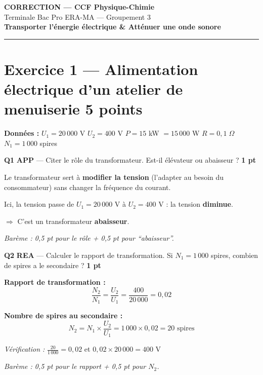 \documentclass[a4paper,11pt]{article}
\newcommand{\pts}[1]{\hfill\textcolor{gris}{\small\textbf{#1}}}
\newcommand{\comp}[1]{\colorbox{blue!10}{\scriptsize\textbf{#1}}}
\begin{document}
\begin{center}
{\LARGE\bfseries\color{rouge} CORRECTION — CCF Physique-Chimie}\\[8pt]
{\large Terminale Bac Pro ERA-MA — Groupement 3}\\[8pt]
{\Large\bfseries Transporter l'énergie électrique \& Atténuer une onde sonore}\\[12pt]
\textcolor{rouge}{\rule{12cm}{1pt}}
\end{center}

\vspace{10pt}

\section*{Exercice 1 — Alimentation électrique d'un atelier de menuiserie \pts{5 points}}

\begin{contextebox}
\textbf{Données :} $U_1 = 20\,000$ V \quad $U_2 = 400$ V \quad $P = 15$ kW $= 15\,000$ W \quad $R = 0{,}1\;\Omega$ \quad $N_1 = 1\,000$ spires
\end{contextebox}

\vspace{6pt}

\textbf{Q1} \comp{APP} — Citer le rôle du transformateur. Est-il élévateur ou abaisseur ? \pts{1 pt}

\begin{corrbox}
Le transformateur sert à \textbf{modifier la tension} (l'adapter au besoin du consommateur) sans changer la fréquence du courant.

Ici, la tension passe de $U_1 = 20\,000$ V à $U_2 = 400$ V : la tension \textbf{diminue}.

$\Rightarrow$ C'est un transformateur \textbf{abaisseur}.

\smallskip
\textit{Barème : 0,5 pt pour le rôle + 0,5 pt pour ``abaisseur''.}
\end{corrbox}

\textbf{Q2} \comp{REA} — Calculer le rapport de transformation. Si $N_1 = 1\,000$ spires, combien de spires a le secondaire ? \pts{1 pt}

\begin{corrbox}
\textbf{Rapport de transformation :}
\[
\frac{N_2}{N_1} = \frac{U_2}{U_1} = \frac{400}{20\,000} = \boxed{0{,}02}
\]

\textbf{Nombre de spires au secondaire :}
\[
N_2 = N_1 \times \frac{U_2}{U_1} = 1\,000 \times 0{,}02 = \boxed{20 \text{ spires}}
\]

\textit{Vérification :} $\frac{20}{1\,000} = 0{,}02$ et $0{,}02 \times 20\,000 = 400$ V \checkmark

\smallskip
\textit{Barème : 0,5 pt pour le rapport + 0,5 pt pour $N_2$.}
\end{corrbox}
\end{document}
